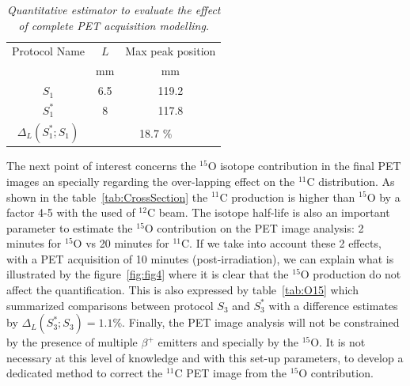 \documentclass[11pt]{iopart}
\begin{document}
\begin{table}[htbp]
\begin{center}
\begin{tabular}{|c|c|c|} \hline
 Protocol Name                & $L$            & Max peak position       \\
                              &  mm                  & mm                       \\ \hline \hline
$S_{1}$                       & 6.5                  &  119.2            \\ \hline 
$S_{1}^{*}$                   & 8                    &  117.8         \\ \hline 
$\Delta_{L}(S_{1}^{*};S_{1})$         &         \multicolumn{2}{c|}{18.7 $\%$}    \\ \hline\hline
\end{tabular}
\end{center} 
\caption{\it Quantitative estimator to evaluate the effect of complete PET acquisition modelling.}
\label{tab:gauss}
\end{table}

The next point of interest concerns the $^{15}$O isotope contribution in the final PET images an specially regarding the over-lapping effect on the $^{11}$C distribution. As shown in the table~\ref{tab:CrossSection} the $^{11}$C production is higher than $^{15}$O by a factor 4-5 with the used of $^{12}$C beam. The isotope half-life is also an important parameter to estimate the $^{15}$O contribution on the PET image analysis: 2 minutes for $^{15}$O vs 20 minutes for $^{11}$C. If we take into account these 2 effects, with a PET acquisition of 10 minutes (post-irradiation), we can explain what is illustrated by the figure~\ref{fig:fig4} where it is clear that the $^{15}$O production do not affect the quantification. This is also expressed by table~\ref{tab:O15} which summarized comparisons between protocol $S_{3}$ and $S_{3}^{*}$ with a difference estimates by $\Delta_{L}(S_{3}^{*};S_{3}) = 1.1 \%$. Finally, the PET image analysis will not be constrained by the presence of multiple $\beta^+$ emitters and specially by the $^{15}$O. It is not necessary at this level of knowledge and with this set-up parameters, to develop
a dedicated method to correct the $^{11}$C PET image from the $^{15}$O contribution. 
\end{document}
